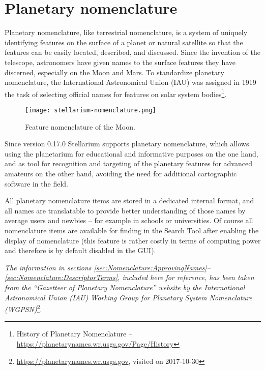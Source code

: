 
\chapter{Planetary nomenclature}
\label{ch:Nomenclature}

 Planetary nomenclature, like terrestrial nomenclature, 
is a system of uniquely identifying features on the surface of a planet or 
natural satellite so that the features can be easily located, described, and discussed. 
Since the invention of the telescope, astronomers have given names to the surface 
features they have discerned, especially on the Moon and Mars. To standardize planetary 
nomenclature, the International Astronomical Union (IAU) was assigned in 1919 the task 
of selecting official names for features on solar system bodies\footnote{History of 
Planetary Nomenclature -- \url{https://planetarynames.wr.usgs.gov/Page/History}}.

\begin{figure}[ht]
\centering\texttt{[image: stellarium-nomenclature.png]}
\caption{Feature nomenclature of the Moon.}
\label{fig:Nomenclature:Moon}
\end{figure}

Since version 0.17.0 Stellarium supports planetary nomenclature, which allows using the 
planetarium for educational and informative purposes on the one hand, and as tool for 
recognition and targeting of the planetary features for advanced amateurs on the other 
hand, avoiding the need for additional cartographic software in the field. 

All planetary nomenclature items are stored in a dedicated internal format, 
and all names are translatable to provide better understanding of those names 
by average users and newbies -- for example in schools or universities.  
Of course all nomenclature items are available for finding in the Search Tool 
after enabling the display of nomenclature (this feature is rather costly in terms of 
computing power and therefore is by default disabled in the GUI).

\emph{The information in sections \ref{sec:Nomenclature:ApprovingNames}--\ref{sec:Nomenclature:DescriptorTerms}, 
included here for reference, has been taken from the ``Gazetteer of Planetary Nomenclature'' website 
by the International Astronomical Union (IAU) Working Group for Planetary System Nomenclature 
(WGPSN)}\footnote{\url{https://planetarynames.wr.usgs.gov}, visited on 2017-10-30}.

